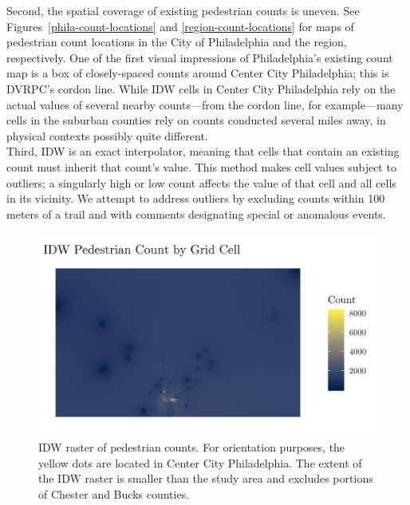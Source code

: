 \documentclass[paper=letterpaper, fontsize=11pt]{scrartcl}
\begin{document}
Second, the spatial coverage of existing pedestrian counts is uneven. See Figures~\ref{phila-count-locations} and \ref{region-count-locations} for maps of pedestrian count locations in the City of Philadelphia and the region, respectively. One of the first visual impressions of Philadelphia's existing count map is a box of closely-spaced counts around Center City Philadelphia; this is DVRPC's cordon line. While IDW cells in Center City Philadelphia rely on the actual values of several nearby counts---from the cordon line, for example---many cells in the suburban counties rely on counts conducted several miles away, in physical contexts possibly quite different. \\

Third, IDW is an exact interpolator, meaning that cells that contain an existing count must inherit that count's value. This method makes cell values subject to outliers; a singularly high or low count affects the value of that cell and all cells in its vicinity. We attempt to address outliers by excluding counts within 100 meters of a trail and with comments designating special or anomalous events. 

\begin{figure}[!htbp]
	\centering
	\includegraphics[width = 5in]{idw.png}
	\caption{IDW raster of pedestrian counts. For orientation purposes, the yellow dots are located in Center City Philadelphia. The extent of the IDW raster is smaller than the study area and excludes portions of Chester and Bucks counties.} \label{raster-idw}
\end{figure}
\end{document}
